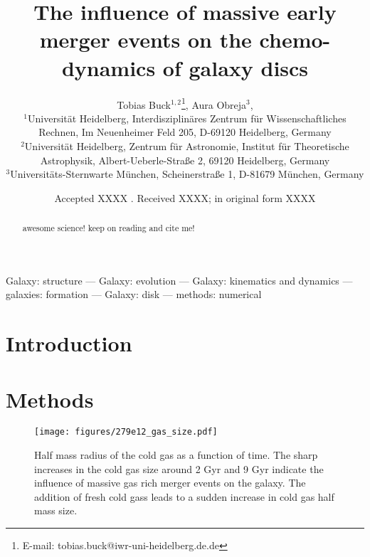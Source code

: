 \documentclass[useAMS,usenatbib]{mnras}
\title[Early massive accretion events in a MW-mass galaxy]{The influence of massive early merger events on the chemo-dynamics of galaxy discs}
\author[T. Buck] {Tobias Buck$^{1,2}$\thanks{E-mail: tobias.buck@iwr-uni-heidelberg.de.de}, Aura Obreja$^{3}$, \etal \\  %
%
$^1$Universit\"at Heidelberg, Interdisziplin\"ares Zentrum f\"ur Wissenschaftliches Rechnen, Im Neuenheimer Feld 205, D-69120 Heidelberg, Germany\\
$^2$Universit\"at Heidelberg, Zentrum f\"ur Astronomie, Institut f\"ur Theoretische Astrophysik, Albert-Ueberle-Straße 2, 69120 Heidelberg, Germany\\
$^3$Universit\"ats-Sternwarte M\"unchen, Scheinerstraße 1, D-81679 M\"unchen, Germany%
}
\begin{document}
\date{Accepted XXXX . Received XXXX; in original form XXXX}

\pagerange{\pageref{firstpage}--\pageref{lastpage}} 

\maketitle

\label{firstpage}


\begin{abstract}
awesome science! keep on reading and cite me! 
\end{abstract}

\noindent
\begin{keywords}

Galaxy: structure --- Galaxy: evolution --- Galaxy: kinematics and dynamics --- galaxies:
  formation --- Galaxy: disk --- methods: numerical
 \end{keywords}



\section{Introduction} \label{sec:introduction}



\section{Methods} \label{sec:simulation}

\begin{figure}
    \begin{centering}
        \texttt{[image: figures/279e12\_gas\_size.pdf]}
        \caption{
            Half mass radius of the cold gas as a function of time. The sharp increases in the cold gas size around 2 Gyr and 9 Gyr indicate the influence of massive gas rich merger events on the galaxy. The addition of fresh cold gass leads to a sudden increase in cold gas half mass size.
        }
        \label{fig:half_mass}
    \end{centering}
\end{figure}
\end{document}

